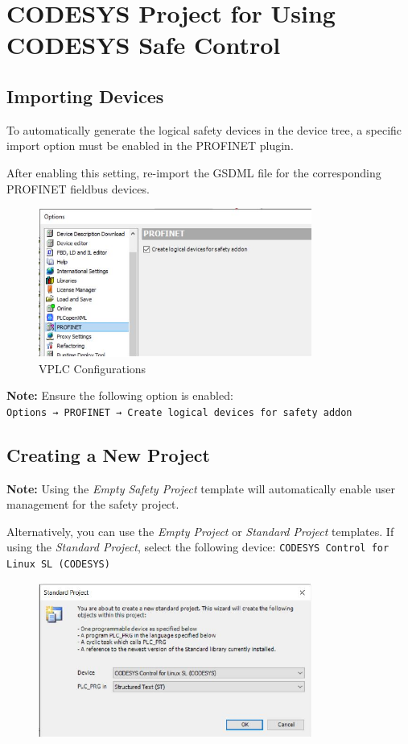\documentclass[a4paper,12pt]{article}
\begin{document}
\newpage


\section{CODESYS Project for Using CODESYS Safe Control}
\label{sec:safe_control_project}

\subsection{Importing Devices}
To automatically generate the logical safety devices in the device tree, a specific import option must be enabled in the PROFINET plugin.

After enabling this setting, re-import the GSDML file for the corresponding PROFINET fieldbus devices.

\begin{figure}[H]
	\centering
	\includegraphics[width=0.8\textwidth]{9.JPG}
	\caption{VPLC Configurations}
\end{figure}

\textbf{Note:} Ensure the following option is enabled: \\
\texttt{Options → PROFINET → Create logical devices for safety addon}

\subsection{Creating a New Project}
\textbf{Note:} Using the \textit{Empty Safety Project} template will automatically enable user management for the safety project.

Alternatively, you can use the \textit{Empty Project} or \textit{Standard Project} templates.  
If using the \textit{Standard Project}, select the following device:  
\texttt{CODESYS Control for Linux SL (CODESYS)}

\begin{figure}[H]
	\centering
	\includegraphics[width=0.8\textwidth]{10.JPG}
\end{figure}
\end{document}
